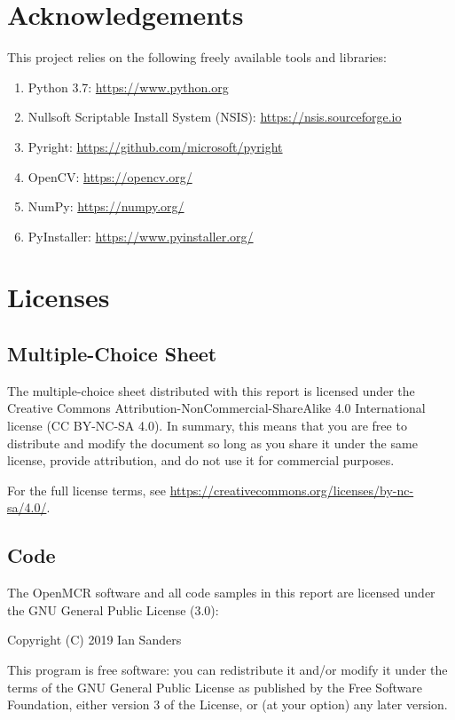 \documentclass[12pt, letterpaper]{report}
\newcommand*{\newappendix}[1]{\newpage\section{#1}}
\begin{document}
\begin{appendices}
\section{Acknowledgements}
\label{sect:acknowledgements}
This project relies on the following freely available tools and libraries:
\begin{enumerate}
  \item Python 3.7: \url{https://www.python.org}
  \item Nullsoft Scriptable Install System (NSIS): \url{https://nsis.sourceforge.io}
  \item Pyright: \url{https://github.com/microsoft/pyright}
  \item OpenCV: \url{https://opencv.org/}
  \item NumPy: \url{https://numpy.org/}
  \item PyInstaller: \url{https://www.pyinstaller.org/}
\end{enumerate}

\newappendix{Licenses}
\label{sect:licenses}

\subsection{Multiple-Choice Sheet}
The multiple-choice sheet distributed with this report is licensed under the
Creative Commons Attribution-NonCommercial-ShareAlike 4.0 International license
(CC BY-NC-SA 4.0). In summary, this means that you are free to distribute and
modify the document so long as you share it under the same license, provide
attribution, and do not use it for commercial purposes.

For the full license terms,
see \url{https://creativecommons.org/licenses/by-nc-sa/4.0/}.

\subsection{Code}
The OpenMCR software and all code samples in this report are licensed under the
GNU General Public License (3.0):
\begin{displayquote}
Copyright (C) 2019 Ian Sanders

This program is free software: you can redistribute it and/or modify
it under the terms of the GNU General Public License as published by
the Free Software Foundation, either version 3 of the License, or
(at your option) any later version.


\end{displayquote}
\end{appendices}
\end{document}
